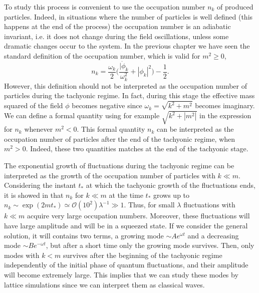\documentclass[11pt,a4paper,twoside]{book}
\begin{document}
To study this process is convenient to use the occupation number $ n_{k} $ of produced particles. Indeed, in situations where the number of particles is well defined (this happens at the end of the process) the occupation number is an adiabatic invariant, i.e. it does not change during the field oscillations, unless some dramatic changes occur to the system. In the previous chapter we have seen the standard definition of the occupation number, which is valid for $ m^{2} \ge 0 $,
\begin{equation}
\label{Chap5:TachyonicModel_occupationNumber}
n_{k}=\frac{\omega_{k}}{2}\Bigg(\frac{|\dot{\phi}_{k}}{\omega_{k}^{2}} + |\phi_{k}|^{2}\Bigg) - \frac{1}{2}.
\end{equation}
However, this definition should not be interpreted as the occupation number of particles during the tachyonic regime. In fact, during this stage the effective mass squared of the field $\phi$ becomes negative since $\omega_{k} = \sqrt{k^{2} + m^{2}}$ becomes imaginary. We can define a formal quantity using for example $ \sqrt{k^{2} + |m^{2}|} $ in the expression for $ n_{k} $ whenever $ m^{2} < 0 $. This formal quantity $ n_{k} $ can be interpreted  as the occupation number of particles after the end of the tachyonic regime, when $ m^{2} > 0 $. Indeed, these two quantities matches at the end of the tachyonic stage.

 The exponential growth of fluctuations during the tachyonic regime can be interpreted as the growth of the occupation number of particles with $ k \ll m $. Considering the instant $ t_{*} $ at which the tachyonic growth of the fluctuations ends, it is showed in \cite{Chap5:TachyonicInstability} that $ n_{k} $ for $ k \ll m  $ at the time $ t_{*} $ grows up to $ n_{k} \sim \exp(2mt_{*})  \simeq \mathcal{O}(10^{2})\lambda^{-1} \gg 1$. Thus, for small $ \lambda $  fluctuations with $ k \ll m $ acquire very large occupation numbers. Moreover, these fluctuations will have large amplitude  and will be in a squeezed state. If we consider the general solution, it will contains two terms, a growing mode $\sim Ae^{\omega t}$ and a decreasing mode $ \sim Be^{-\omega t} $, but after a short time only the growing mode survives. Then, only modes with $ k < m $ survives after the beginning of the tachyonic regime independently of the initial phase of quantum fluctuations, and their amplitude will become extremely large. This implies that we can study these modes by lattice simulations since we can interpret them as classical waves. 
 
\end{document}
